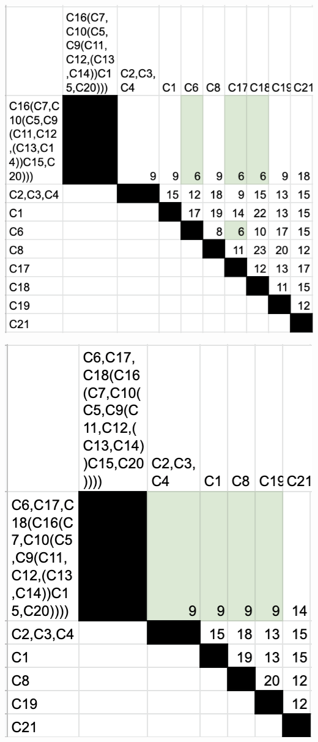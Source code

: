\documentclass[a4paper,table,xcdraw]{article}
\begin{document}
\includegraphics[scale=0.8]{./img/carac10.png}

\includegraphics[scale=0.8]{./img/carac11.png}
\end{document}
